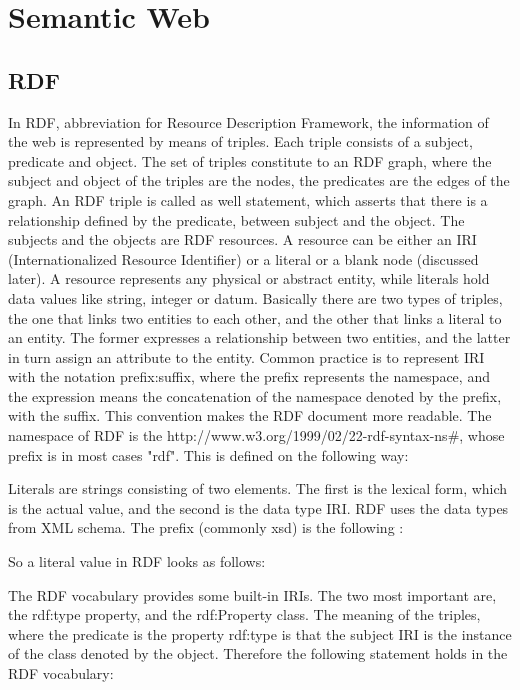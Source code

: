 \section{Semantic Web}

\subsection{RDF}

In RDF, abbreviation for Resource Description Framework, the information of the web is represented by means of triples. Each triple consists of a subject, predicate and object. The set of triples constitute to an RDF graph, where the subject and object of the triples are the nodes, the predicates are the edges of the graph.
An RDF triple is called as well statement, which asserts that there is a relationship defined by the predicate, between subject and the object. The subjects and the objects are RDF resources. A resource can be either an IRI (Internationalized Resource Identifier) or a literal or a blank node (discussed later). A resource represents any physical or abstract entity, while literals hold data values like string, integer or datum. 
Basically there are two types of triples, the one that links two entities to each other, and the other that links a literal to an entity. The former expresses a relationship between two entities, and the latter in turn assign an attribute to the entity.
Common practice is to represent IRI with the notation prefix:suffix, where the prefix represents the namespace, and the expression means the concatenation of the namespace denoted by the prefix, with the suffix. This convention makes the RDF document more readable. The namespace of RDF is the http://www.w3.org/1999/02/22-rdf-syntax-ns\#, whose prefix is in most cases "rdf".   This is defined on the following way:



Literals are strings consisting of two elements. The first is the lexical form, which is the actual value, and the second is the data type IRI.  RDF uses the data types from XML schema. The prefix (commonly xsd) is the following :


So a literal value in RDF looks as follows:


The RDF vocabulary provides some built-in IRIs. The two most important are, the rdf:type property, and the rdf:Property class. The meaning of the triples, where the predicate is the property rdf:type  is that the subject IRI is the instance of the class denoted by the object. Therefore the following statement holds in the RDF vocabulary:

